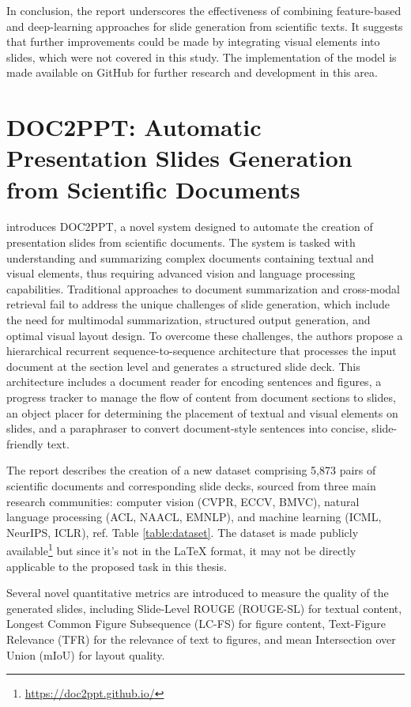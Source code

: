 In conclusion, the report underscores the effectiveness of combining feature-based and deep-learning approaches for slide generation from scientific texts. It suggests that further improvements could be made by integrating visual elements into slides, which were not covered in this study. The implementation of the model is made available on GitHub for further research and development in this area.

\section{DOC2PPT: Automatic Presentation Slides Generation from Scientific Documents}

\citet{Fu:2022:AAAI} introduces DOC2PPT, a novel system designed to automate the creation of presentation slides from scientific documents. The system is tasked with understanding and summarizing complex documents containing textual and visual elements, thus requiring advanced vision and language processing capabilities. Traditional approaches to document summarization and cross-modal retrieval fail to address the unique challenges of slide generation, which include the need for multimodal summarization, structured output generation, and optimal visual layout design. To overcome these challenges, the authors propose a hierarchical recurrent sequence-to-sequence architecture that processes the input document at the section level and generates a structured slide deck. This architecture includes a document reader for encoding sentences and figures, a progress tracker to manage the flow of content from document sections to slides, an object placer for determining the placement of textual and visual elements on slides, and a paraphraser to convert document-style sentences into concise, slide-friendly text.

The report describes the creation of a new dataset comprising 5,873 pairs of scientific documents and corresponding slide decks, sourced from three main research communities: computer vision (CVPR, ECCV, BMVC), natural language processing (ACL, NAACL, EMNLP), and machine learning (ICML, NeurIPS, ICLR), ref. Table \ref{table:dataset}. The dataset is made publicly available\footnote{\url{https://doc2ppt.github.io/}} but since it's not in the \LaTeX{} format, it may not be directly applicable to the proposed task in this thesis. 

Several novel quantitative metrics are introduced to measure the quality of the generated slides, including Slide-Level ROUGE (ROUGE-SL) for textual content, Longest Common Figure Subsequence (LC-FS) for figure content, Text-Figure Relevance (TFR) for the relevance of text to figures, and mean Intersection over Union (mIoU) for layout quality.

